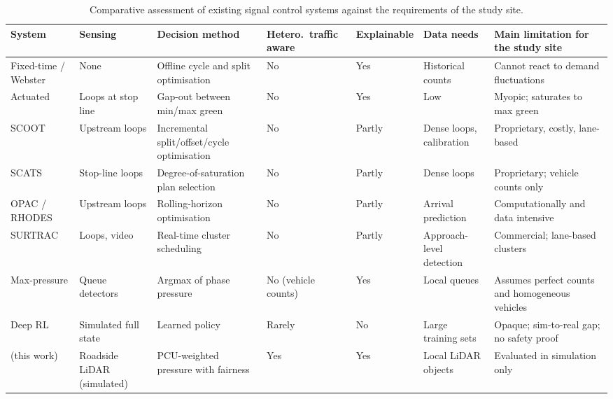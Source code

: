 \begin{table}[htbp]
\centering
\caption{Comparative assessment of existing signal control systems against the requirements of the study site.}
\label{tab:lit-systems}
\footnotesize\setlength{\tabcolsep}{3pt}\renewcommand{\arraystretch}{1.15}
\begin{tabularx}{\textwidth}{>{\raggedright\arraybackslash}p{1.9cm} >{\raggedright\arraybackslash}p{1.7cm}
  >{\raggedright\arraybackslash}p{2.1cm} >{\centering\arraybackslash}p{1.2cm} >{\centering\arraybackslash}p{1.25cm}
  >{\raggedright\arraybackslash}p{1.55cm} >{\raggedright\arraybackslash}X}
\toprule
System & Sensing & Decision method & Hetero.\ traffic aware & Explain\-able & Data needs & Main limitation for the study site \\
\midrule
Fixed-time / Webster \cite{webster1958} & None & Offline cycle and split optimisation & No & Yes & Historical counts & Cannot react to demand fluctuations \\
Actuated \cite{koonce2008timing} & Loops at stop line & Gap-out between min/max green & No & Yes & Low & Myopic; saturates to max green \\
SCOOT \cite{hunt1981scoot} & Upstream loops & Incremental split/offset/cycle optimisation & No & Partly & Dense loops, calibration & Proprietary, costly, lane-based \\
SCATS \cite{sims1980scats} & Stop-line loops & Degree-of-saturation plan selection & No & Partly & Dense loops & Proprietary; vehicle counts only \\
OPAC / RHODES \cite{gartner1983opac,mirchandani2001rhodes} & Upstream loops & Rolling-horizon optimisation & No & Partly & Arrival prediction & Computationally and data intensive \\
SURTRAC \cite{xie2012surtrac} & Loops, video & Real-time cluster scheduling & No & Partly & Approach-level detection & Commercial; lane-based clusters \\
Max-pressure \cite{varaiya2013maxpressure,levin2023maxpressure} & Queue detectors & Argmax of phase pressure & No (vehicle counts) & Yes & Local queues & Assumes perfect counts and homogeneous vehicles \\
Deep RL \cite{wei2021recent,noaeen2022rl} & Simulated full state & Learned policy & Rarely & No & Large training sets & Opaque; sim-to-real gap; no safety proof \\
\midrule
\prism{} (this work) & Roadside LiDAR (simulated) & PCU-weighted pressure with fairness & Yes & Yes & Local LiDAR objects & Evaluated in simulation only \\
\bottomrule
\end{tabularx}
\end{table}

